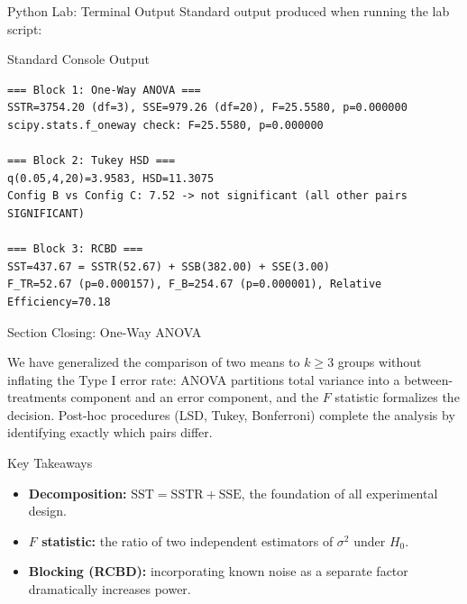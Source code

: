 \documentclass[10pt, aspectratio=169]{beamer}
\begin{document}
\begin{frame}[fragile]{Python Lab: Terminal Output}
  \scriptsize
  Standard output produced when running the lab script:
  \vspace{0.02cm}
  \begin{block}{Standard Console Output}
    \fontsize{3.8pt}{4.6pt}\selectfont
    \begin{verbatim}
=== Block 1: One-Way ANOVA ===
SSTR=3754.20 (df=3), SSE=979.26 (df=20), F=25.5580, p=0.000000
scipy.stats.f_oneway check: F=25.5580, p=0.000000

=== Block 2: Tukey HSD ===
q(0.05,4,20)=3.9583, HSD=11.3075
Config B vs Config C: 7.52 -> not significant (all other pairs SIGNIFICANT)

=== Block 3: RCBD ===
SST=437.67 = SSTR(52.67) + SSB(382.00) + SSE(3.00)
F_TR=52.67 (p=0.000157), F_B=254.67 (p=0.000001), Relative Efficiency=70.18
    \end{verbatim}
  \end{block}
\end{frame}


\begin{frame}{Section Closing: One-Way ANOVA}
  \begin{reflexion}
    We have generalized the comparison of two means to $k\geq3$ groups without inflating the Type I error rate: ANOVA partitions total variance into a between-treatments component and an error component, and the $F$ statistic formalizes the decision. Post-hoc procedures (LSD, Tukey, Bonferroni) complete the analysis by identifying exactly which pairs differ.
  \end{reflexion}

  \vspace{0.2cm}
  \pause
  \begin{block}{Key Takeaways}
    \begin{itemize}\itemsep=0.08cm
      \item \textbf{Decomposition:} $\text{SST}=\text{SSTR}+\text{SSE}$, the foundation of all experimental design.
      \item \textbf{$F$ statistic:} the ratio of two independent estimators of $\sigma^2$ under $H_0$.
      \item \textbf{Blocking (RCBD):} incorporating known noise as a separate factor dramatically increases power.
    \end{itemize}
  \end{block}
\end{frame}
\end{document}
